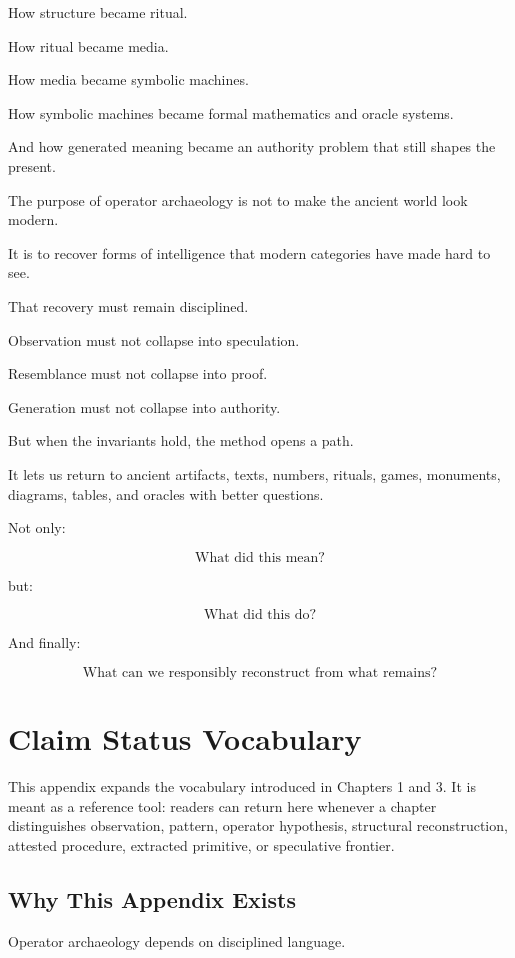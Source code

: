 \documentclass[11pt]{book}
\begin{document}
How structure became ritual.

How ritual became media.

How media became symbolic machines.

How symbolic machines became formal mathematics and oracle systems.

And how generated meaning became an authority problem that still shapes the present.

The purpose of operator archaeology is not to make the ancient world look modern.

It is to recover forms of intelligence that modern categories have made hard to see.

That recovery must remain disciplined.

Observation must not collapse into speculation.

Resemblance must not collapse into proof.

Generation must not collapse into authority.

But when the invariants hold, the method opens a path.

It lets us return to ancient artifacts, texts, numbers, rituals, games, monuments, diagrams, tables, and oracles with better questions.

Not only:

\[
\text{What did this mean?}
\]

but:

\[
\text{What did this do?}
\]

And finally:

\[
\text{What can we responsibly reconstruct from what remains?}
\]

\appendix
\chapter{Claim Status Vocabulary}

This appendix expands the vocabulary introduced in Chapters 1 and 3. It is meant as a reference tool: readers can return here whenever a chapter distinguishes observation, pattern, operator hypothesis, structural reconstruction, attested procedure, extracted primitive, or speculative frontier.

\section{Why This Appendix Exists}

Operator archaeology depends on disciplined language.
\end{document}
